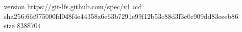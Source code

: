 version https://git-lfs.github.com/spec/v1
oid sha256:66f975000fd048f4e44358a6c63b7291e99f12b53e88d3f3c0e909dd83eeeb86
size 8388704
